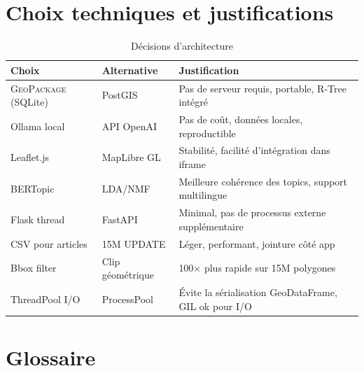 \documentclass[11pt,a4paper]{report}
\newcommand{\gpkg}{\textsc{GeoPackage}}
\begin{document}
 

\section{Choix techniques et justifications}

\begin{table}[H]
\centering
\begin{tabular}{p{4cm}p{4cm}p{5cm}}
\toprule
\rowcolor{seuilgris!75}
\textbf{Choix} & \textbf{Alternative} & \textbf{Justification} \\
\midrule
\gpkg{} (SQLite) & PostGIS & Pas de serveur requis, portable, R-Tree intégré \\
Ollama local & API OpenAI & Pas de coût, données locales, reproductible \\
Leaflet.js & MapLibre GL & Stabilité, facilité d'intégration dans iframe \\
BERTopic & LDA/NMF & Meilleure cohérence des topics, support multilingue \\
Flask thread & FastAPI & Minimal, pas de processus externe supplémentaire \\
CSV pour articles & 15M UPDATE & Léger, performant, jointure côté app \\
Bbox filter & Clip géométrique & 100× plus rapide sur 15M polygones \\
ThreadPool I/O & ProcessPool & Évite la sérialisation GeoDataFrame, GIL ok pour I/O \\
\bottomrule
\end{tabular}
\caption{Décisions d'architecture}
\end{table}

\section{Glossaire}
\end{document}
